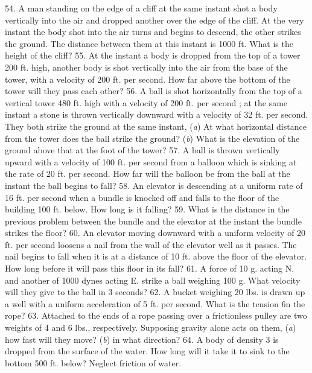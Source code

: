 54. A man standing on the edge of a cliff at the same instant shot a body vertically into the air and dropped another over the edge of the cliff. At the very instant the body shot into the air turns and begins to descend, the other strikes the ground. The distance between them at this instant is 1000 ft. What is the height of the cliff?
55. At the instant a body is dropped from the top of a tower 200 ft. high, another body is shot vertically into the air from the base of the tower, with a velocity of 200 ft. per second. How far above the bottom of the tower will they pass each other?
56. A ball is shot horizontally from the top of a vertical tower 480 ft. high with a velocity of 200 ft. per second ; at the same instant a stone is thrown vertically downward with a velocity of 32 ft. per second. They both strike the ground at the same instant, (\emph{a}) At what horizontal distance from the tower does the ball strike the ground? (\emph{b}) What is the elevation of the ground above that at the foot of the tower?
57. A ball is thrown vertically upward with a velocity of 100 ft. per second from a balloon which is sinking at the rate of 20 ft. per second. How far will the balloon be from the ball at the instant the ball begins to fall?
58. An elevator is descending at a uniform rate of 16 ft. per second when a bundle is knocked off and falls to the floor of the building 100 ft. below. How long is it falling?
59. What is the distance in the previous problem between the bundle and the elevator at the instant the bundle strikes the floor?
60. An elevator moving downward with a uniform velocity of 20 ft. per second loosens a nail from the wall of the elevator well as it passes. The nail begins to fall when it is at a distance of 10 ft. above the floor of the elevator. How long before it will pass this floor in its fall?
61. A force of 10 g. acting N. and another of 1000 dynes acting E. strike a ball weighing 100 g. What velocity will they give to the ball in 3 seconds?
62. A bucket weighing 20 lbs. is drawn up a well with a uniform acceleration of 5 ft. per second. What is the tension 6n the rope?
63. Attached to the ends of a rope passing over a frictionless pulley are two weights of 4 and 6 lbs., respectively. Supposing gravity alone acts on them, (\emph{a}) how fast will they move? (\emph{b}) in what direction?
64. A body of density 3 is dropped from the surface of the water. How long will it take it to sink to the bottom 500 ft. below? Neglect friction of water.
